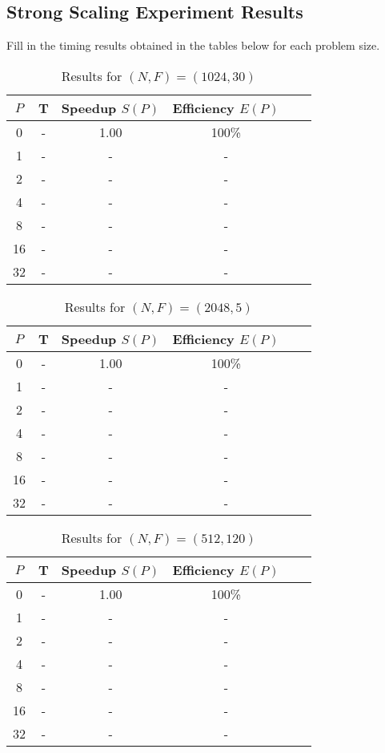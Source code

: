 \subsection*{Strong Scaling Experiment Results}
Fill in the timing results obtained in the tables below for each problem size. 

\begin{table}[H]
\begin{center}
\begin{tabular}{|c|c|c|c|c|c|}
\hline
\(P\) & T & Speedup \(S(P)\) & Efficiency \(E(P)\) \\
\hline
0 & - & 1.00 & 100\% \\
1 & - & - & - \\
2 & - & - & - \\
4 & - & - & - \\
8 & - & - & - \\
16 & - & - & - \\
32 & - & - & - \\
\hline
\end{tabular}
\end{center}
\caption{Results for $(N, F) = (1024, 30)$}
\end{table}

\begin{table}[H]
\begin{center}
\begin{tabular}{|c|c|c|c|c|c|}
\hline
\(P\) & T & Speedup \(S(P)\) & Efficiency \(E(P)\) \\
\hline
0 & - & 1.00 & 100\% \\
1 & - & - & - \\
2 & - & - & - \\
4 & - & - & - \\
8 & - & - & - \\
16 & - & - & - \\
32 & - & - & - \\
\hline
\end{tabular}
\end{center}
\caption{Results for $(N, F) = (2048, 5)$}
\end{table}

\begin{table}[H]
\begin{center}
\begin{tabular}{|c|c|c|c|c|c|}
\hline
\(P\) & T & Speedup \(S(P)\) & Efficiency \(E(P)\) \\
\hline
0 & - & 1.00 & 100\% \\
1 & - & - & - \\
2 & - & - & - \\
4 & - & - & - \\
8 & - & - & - \\
16 & - & - & - \\
32 & - & - & - \\
\hline
\end{tabular}
\end{center}
\caption{Results for $(N, F) = (512, 120)$}
\end{table}

